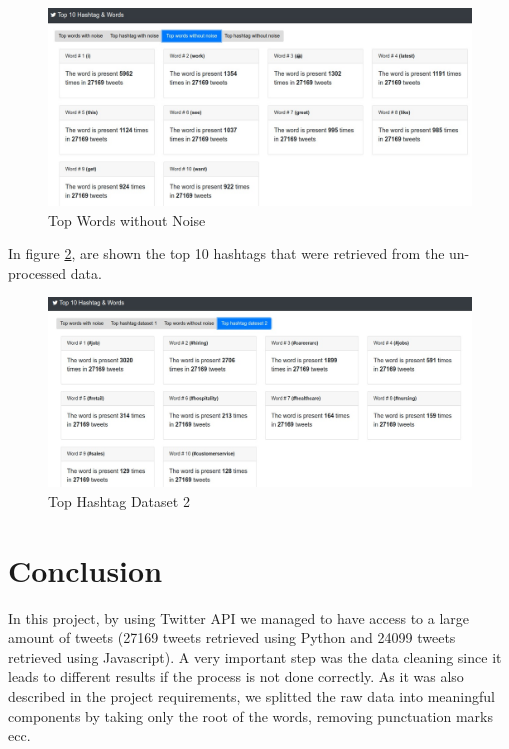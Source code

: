 \documentclass{article}
\newcommand*\setcaptioncitation[1]{\def\captioncitation{\textit{Source:}~#1}}
\let\captioncitation\relax
\begin{document}
        \begin{figure}[H]
            \centering 
            \includegraphics[width=1\linewidth]{./img/topwordswithoutnoise.jpeg}
            \setcaptioncitation{self-made}
            \caption{Top Words without Noise}
            \label{fig: Top Words without Noise}
        \end{figure}
        In figure \ref{fig: Top Hashtag Dataset 2}, are shown the top 10 hashtags that were retrieved from the un-processed data.
        \begin{figure}[H]
            \centering 
            \includegraphics[width=1\linewidth]{./img/tophashtagdataset2.jpeg}
            \setcaptioncitation{self-made}
            \caption{Top Hashtag Dataset 2}
            \label{fig: Top Hashtag Dataset 2}
        \end{figure}

        \section{Conclusion}
In this project, by using Twitter API we managed to have access to a large amount of tweets (27169 tweets retrieved using Python and 24099 tweets retrieved using Javascript). A very important step was the data cleaning since it leads to different results if the process is not done correctly. As it was also described in the project requirements, we splitted the raw data into meaningful components by taking only the root of the words, removing punctuation marks ecc.
\end{document}
